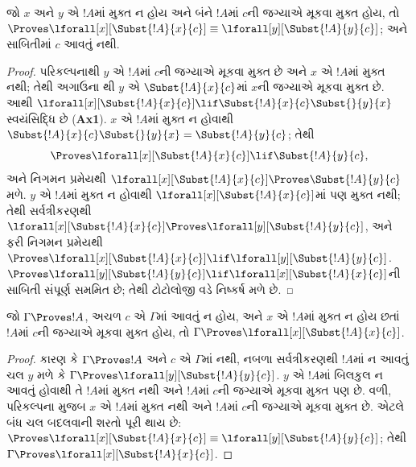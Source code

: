 \begin{lem}[બંધ ચલનું પરિવર્તન]
જો $x$ અને $y$ એ $!A$માં મુક્ત
ન હોય અને બંને $!A$માં $c$ની
જગ્યાએ મૂકવા મુક્ત
હોય, તો $\Proves \lforall[x][\Subst{!A}{x}{c}] \equiv
\lforall[y][\Subst{!A}{y}{c}]$;
અને સાબિતીમાં $c$ આવતું નથી.
\end{lem}

\begin{proof}
પરિકલ્પનાથી $y$ એ $!A$માં
$c$ની જગ્યાએ મૂકવા મુક્ત
છે અને $x$ એ $!A$માં મુક્ત
નથી; તેથી અગાઉના
થી $y$ એ
$\Subst{!A}{x}{c}$માં
$x$ની જગ્યાએ મૂકવા
મુક્ત છે. આથી
$\lforall[x][\Subst{!A}{x}{c}] \lif \Subst{!A}{x}{c} \Subst{}{y}{x}$
સ્વયંસિદ્ધિ છે (\textbf{Ax1}).
$x$ એ $!A$માં મુક્ત
ન હોવાથી
$\Subst{!A}{x}{c} \Subst{}{y}{x} = \Subst{!A}{y}{c}$;
તેથી
\[
\Proves \lforall[x][\Subst{!A}{x}{c}] \lif \Subst{!A}{y}{c}, 
\] 
અને નિગમન પ્રમેયથી
$\lforall[x][\Subst{!A}{x}{c}] \Proves
\Subst{!A}{y}{c}$ મળે.
$y$ એ $!A$માં મુક્ત
ન હોવાથી
$\lforall[x][\Subst{!A}{x}{c}]$માં
પણ મુક્ત નથી; તેથી
સર્વત્રીકરણથી
$\lforall[x][\Subst{!A}{x}{c}] \Proves \lforall[y][\Subst{!A}{y}{c}]$,
અને ફરી નિગમન
પ્રમેયથી $\Proves
\lforall[x][\Subst{!A}{x}{c}] \lif \lforall[y][\Subst{!A}{y}{c}]$.
$\Proves \lforall[y][\Subst{!A}{y}{c}] \lif \lforall[x]
[\Subst{!A}{x}{c}]$ની
સાબિતી સંપૂર્ણ
સમમિત છે; તેથી
ટોટોલોજી વડે
નિષ્કર્ષ મળે છે.
\end{proof}

\begin{thm}
જો $\Gamma \Proves !A$, અચળ
$c$ એ $\Gamma$માં આવતું ન હોય,
અને $x$ એ $!A$માં મુક્ત
ન હોય છતાં $!A$માં
$c$ની જગ્યાએ મૂકવા
મુક્ત હોય, તો
$\Gamma \Proves \lforall[x][\Subst{!A}{x}{c}]$.
\end{thm}

\begin{proof}
કારણ કે $\Gamma \Proves !A$
અને $c$ એ $\Gamma$માં
નથી, નબળા સર્વત્રીકરણથી
$!A$માં ન આવતું
ચલ $y$ મળે કે
$\Gamma \Proves \lforall[y][\Subst{!A}{y}{c}]$.
$y$ એ $!A$માં બિલકુલ
ન આવતું હોવાથી તે
$!A$માં મુક્ત નથી
અને $!A$માં $c$ની જગ્યાએ
મૂકવા મુક્ત પણ છે.
વળી, પરિકલ્પના મુજબ
$x$ એ $!A$માં
મુક્ત નથી અને
$!A$માં $c$ની જગ્યાએ
મૂકવા મુક્ત છે.
એટલે બંધ ચલ
બદલવાની શરતો પૂરી થાય છે:
$\Proves \lforall[x][\Subst{!A}{x}{c}] \equiv
\lforall[y][\Subst{!A}{y}{c}]$;
તેથી $\Gamma \Proves
\lforall[x][\Subst{!A}{x}{c}]$.
\end{proof}

